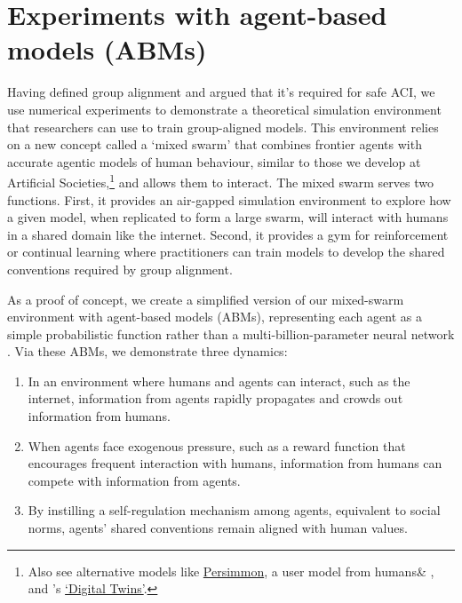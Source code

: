 \section{Experiments with agent-based models (ABMs)}

Having defined group alignment and argued that it's required for safe ACI, we use numerical experiments to demonstrate a theoretical simulation environment that researchers can use to train group-aligned models. This environment relies on a new concept called a ‘mixed swarm’ that combines frontier agents with accurate agentic models of human behaviour, similar to those we develop at Artificial Societies,\footnote{Also see alternative models like \href{https://persimmon.humansand.ai/blog/persimmon.html}{Persimmon}, a user model from humans\& \parencite{humans_persimmon_2026}, and \citeauthor{park_generative_2023}’s \parencite*{park_generative_2023} \href{https://dl.acm.org/doi/abs/10.1145/3586183.3606763}{‘Digital Twins’}.} and allows them to interact. The mixed swarm serves two functions. First, it provides an air-gapped simulation environment to explore how a given model, when replicated to form a large swarm, will interact with humans in a shared domain like the internet. Second, it provides a gym for reinforcement or continual learning where practitioners can train models to develop the shared conventions required by group alignment.

As a proof of concept, we create a simplified version of our mixed-swarm environment with agent-based models (ABMs), representing each agent as a simple probabilistic function rather than a multi-billion-parameter neural network \parencite{macal2009, schelling1971,epstein1996}. Via these ABMs, we demonstrate three dynamics:

\begin{enumerate}
    \item In an environment where humans and agents can interact, such as the internet, information from agents rapidly propagates and crowds out information from humans.
    \item When agents face exogenous pressure, such as a reward function that encourages frequent interaction with humans, information from humans can compete with information from agents.
    \item By instilling a self-regulation mechanism among agents, equivalent to social norms, agents’ shared conventions remain aligned with human values.
\end{enumerate}

